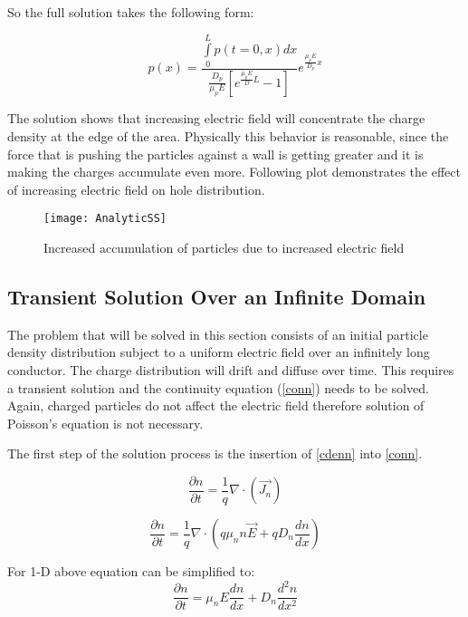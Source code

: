\begin{doublespace}
So the full solution takes the following form:

\begin{equation}
p(x)=\frac{\int\limits_{0}^{L}p(t=0,x)dx}{\frac{D_p}{\mu_p E}[e^{\frac{\mu_p E}{D}L} -1]}e^{\frac{\mu_{p} E}{D_{p}}x}
\end{equation}

The solution shows that increasing electric field will concentrate the charge density at the edge of the area. Physically this behavior is reasonable, since the force that is pushing the particles against a wall is getting greater and it is making the charges accumulate even more. Following plot demonstrates the effect of increasing electric field on hole distribution.

\begin{figure}[!htp]
\centering
\texttt{[image: AnalyticSS]}
\caption{Increased accumulation of particles due to increased electric field} 
\end{figure}

\clearpage
\subsection{Transient Solution Over an Infinite Domain}

The problem that will be solved in this section consists of an initial particle density distribution subject to a uniform electric field over an infinitely long conductor. The charge distribution will drift and diffuse over time. This requires a transient solution and the continuity equation (\ref{conn}) needs to be solved. Again, charged particles do not affect the electric field therefore solution of Poisson's equation is not necessary. 

The first step of the solution process is the insertion of \eqref{cdenn} into \eqref{conn}.

\begin{equation}
\frac{\partial n}{\partial t} = \frac{1}{q}\nabla \cdot (\vec{J_n})
\end{equation}


\begin{equation}
\frac{\partial n}{\partial t} = \frac{1}{q}\nabla \cdot (q \mu_{n} n \vec{E}+qD_{n} \frac{dn}{dx} )
\end{equation}

For 1-D above equation can be simplified to:
\begin{equation}
\frac{\partial n}{\partial t} = \mu_n E \frac{d n}{d x}+D_{n}\frac{d^{2}n}{dx^{2}}
\label{adifg}
\end{equation}


\end{doublespace}
